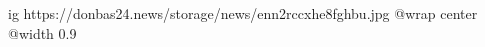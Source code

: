  
 
 
 
 

\ifcmt
  ig https://donbas24.news/storage/news/enn2rccxhe8fghbu.jpg
  @wrap center
  @width 0.9
\fi
